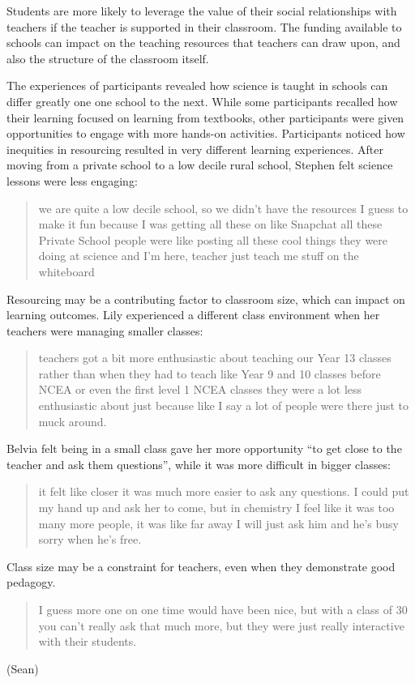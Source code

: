 Students are more likely to leverage the value of their social relationships with teachers if the teacher is supported in their classroom. The funding available to schools can impact on the teaching resources that teachers can draw upon, and also the structure of the classroom itself. 

The experiences of participants revealed how science is taught in schools can differ greatly one one school to the next. While some participants recalled how their learning focused on learning from textbooks, other participants were given opportunities to engage with more hands-on activities. Participants noticed how inequities in resourcing resulted in very different learning experiences. After moving from a private school to a low decile rural school, Stephen felt science lessons were less engaging: \blockquote{we are quite a low decile school, so we didn't have the resources I guess to make it fun because I was getting all these on like Snapchat all these Private School people were like posting all these cool things they were doing at science and I'm here, teacher just teach me stuff on the whiteboard}.  


Resourcing may be a contributing factor to classroom size, which can impact on learning outcomes. Lily experienced a different class environment when her teachers were managing smaller classes: \blockquote{teachers got a bit more enthusiastic about teaching our Year 13 classes rather than when they had to teach like Year 9 and 10 classes before NCEA or even the first level 1 NCEA classes they were a lot less enthusiastic about just because like I say a lot of people were there just to muck around.}. Belvia felt being in a small class gave her more opportunity ``to get close to the teacher and ask them questions'', while it was more difficult in bigger classes: \blockquote{it felt like closer it was much more easier to ask any questions. I could put my hand up and ask her to come, but in chemistry I feel like it was too many more people, it was like far away I will just ask him and he's busy sorry when he's free.} Class size may be a constraint for teachers, even when they demonstrate good pedagogy. \blockquote{I guess more one on one time would have been nice, but with a class of 30 you can’t really ask that much more, but they were just really interactive with their students.} (Sean)





